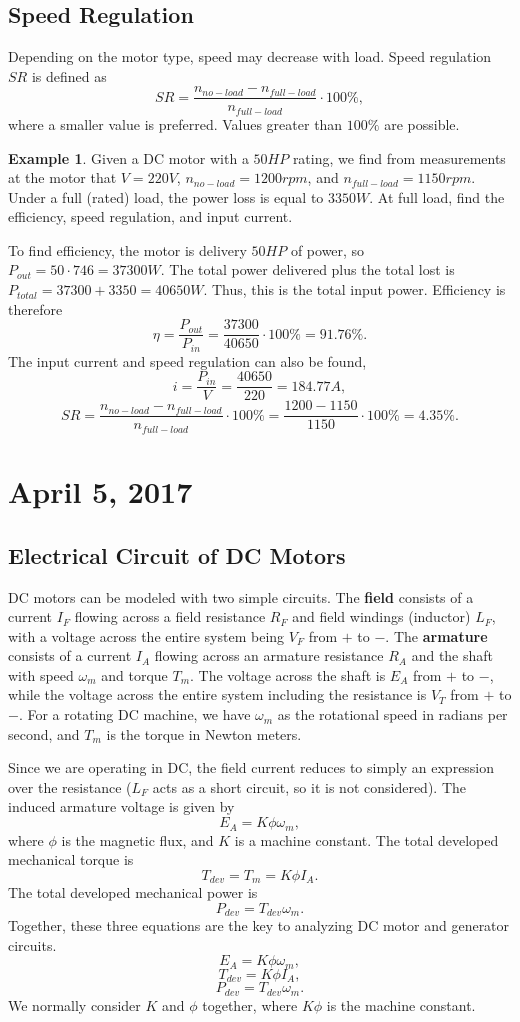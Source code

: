 \documentclass[11pt]{article}
\theoremstyle{plain} %
\theoremstyle{definition}
\theoremstyle{example}
\newtheorem*{example}{Example}
\theoremstyle{remark}
\begin{document}
\subsection{Speed Regulation}
Depending on the motor type, speed may decrease with load. Speed regulation $SR$ is defined as 
$$SR = \frac{n_{no-load}-n_{full-load}}{n_{full-load}}\cdot 100\%,$$
where a smaller value is preferred. Values greater than $100\%$ are possible. 
\begin{example}
Given a DC motor with a $50HP$ rating, we find from measurements at the motor that $V = 220V$, $n_{no-load} = 1200rpm$, and $n_{full-load} = 1150 rpm$. Under a full (rated) load, the power loss is equal to $3350W$. At full load, find the efficiency, speed regulation, and input current. 
\end{example}
To find efficiency, the motor is delivery $50HP$ of power, so $P_{out} = 50\cdot 746 = 37300W$. The total power delivered plus the total lost is $P_{total} = 37300+3350 = 40650W$. Thus, this is the total input power. Efficiency is therefore 
$$\eta = \frac{P_{out}}{P_{in}} = \frac{37300}{40650}\cdot 100\% = 91.76\%.$$
The input current and speed regulation can also be found,
$$i = \frac{P_{in}}{V} = \frac{40650}{220} = 184.77A,$$
$$SR = \frac{n_{no-load}-n_{full-load}}{n_{full-load}}\cdot 100\% = \frac{1200-1150}{1150}\cdot 100\% = 4.35\%.$$

\section{April 5, 2017}
\subsection{Electrical Circuit of DC Motors}
DC motors can be modeled with two simple circuits. The \textbf{field} consists of a current $I_F$ flowing across a field resistance $R_F$ and field windings (inductor) $L_F$, with a voltage across the entire system being $V_F$ from $+$ to $-$. The \textbf{armature} consists of a current $I_A$ flowing across an armature resistance $R_A$ and the shaft with speed $\omega_m$ and torque $T_m$. The voltage across the shaft is $E_A$ from $+$ to $-$, while the voltage across the entire system including the resistance is $V_T$ from $+$ to $-$. For a rotating DC machine, we have $\omega_m$ as the rotational speed in radians per second, and $T_m$ is the torque in Newton meters. 

Since we are operating in DC, the field current reduces to simply an expression over the resistance ($L_F$ acts as a short circuit, so it is not considered). The induced armature voltage is given by 
$$E_A = K\phi\omega_m,$$
where $\phi$ is the magnetic flux, and $K$ is a machine constant. The total developed mechanical torque is 
$$T_{dev} = T_m = K\phi I_A.$$
The total developed mechanical power is 
$$P_{dev} = T_{dev}\omega_m.$$
Together, these three equations are the key to analyzing DC motor and generator circuits. 
$$E_A = K\phi\omega_m,$$
$$T_{dev} = K\phi I_A,$$
$$P_{dev} = T_{dev}\omega_m.$$
We normally consider $K$ and $\phi$ together, where $K\phi$ is the machine constant.
\end{document}
